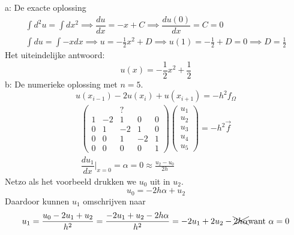 \documentclass[11pt]{article}
\begin{document}
a: De exacte oplossing\\
\begin{gather*}
\int d^2u=\int dx^2 \implies \dfrac{du}{dx} = -x + C\implies \dfrac{du(0)}{dx} = C = 0\\
\int{du} = \int -x dx \implies u = -\frac{1}{2}x^2 + D \implies u(1) = -\frac{1}{2} + D = 0 \implies D = \frac{1}{2}
\end{gather*}
Het uiteindelijke antwoord:
$$u(x) = -\frac{1}{2}x^2 + \frac{1}{2}$$
b: De numerieke oplossing met $n = 5$.
$$
u(x_{i-1}) - 2u(x_{i}) + u(x_{i+1}) = -h^2f_{\Omega}
$$
\begin{gather*}
\begin{pmatrix}
	  &  & ?&  &  \\
	 1&-2& 1& 0& 0\\
	 0& 1&-2& 1& 0\\
	 0& 0& 1&-2& 1\\
	 0& 0& 0& 0& 1
\end{pmatrix}
\begin{pmatrix}
	u_{1}\\
	u_{2}\\
	u_{3}\\
	u_{4}\\
	u_{5}
\end{pmatrix}=-h^2\vec{f}\\
\dfrac{du_{1}}{dx}\Big|_{x = 0} = \alpha = 0\approx \frac{u_{2}-u_{0}}{2h}
\end{gather*}
Netzo als het voorbeeld drukken we $u_{0}$ uit in $u_{2}$.
$$
u_{0} = -2h\alpha + u_{2}
$$
Daardoor kunnen $u_{1}$ omschrijven naar
$$
u_{1} = \frac{u_{0}-2u_{1}+u_{2}}{h^2} = \frac{-2u_{1}+u_{2}-2h\alpha}{h^2} = -2u_{1} + 2u_{2} - \xcancel{2h\alpha} \text{want } \alpha = 0
$$
\end{document}
